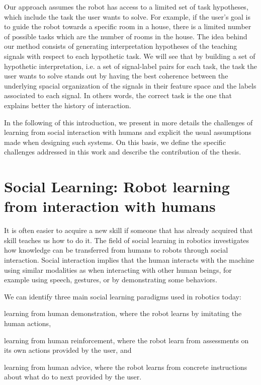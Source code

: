Our approach assumes the robot has access to a limited set of task hypotheses, which include the task the user wants to solve. For example, if the user's goal is to guide the robot towards a specific room in a house, there is a limited number of possible tasks which are the number of rooms in the house. The idea behind our method consists of generating interpretation hypotheses of the teaching signals with respect to each hypothetic task. We will see that by building a set of hypothetic interpretation, i.e. a set of signal-label pairs for each task, the task the user wants to solve stands out by having the best coherence between the underlying spacial organization of the signals in their feature space and the labels associated to each signal. In others words, the correct task is the one that explains better the history of interaction.

In the following of this introduction, we present in more details the challenges of learning from social interaction with humans and explicit the usual assumptions made when designing such systems. On this basis, we define the specific challenges addressed in this work and describe the contribution of the thesis.

\section{Social Learning: Robot learning from interaction with humans}
\label{sec:intro:social}

It is often easier to acquire a new skill if someone that has already acquired that skill teaches us how to do it. The field of social learning in robotics investigates how knowledge can be transferred from humans to robots through social interaction. Social interaction implies that the human interacts with the machine using similar modalities as when interacting with other human beings, for example using speech, gestures, or by demonstrating some behaviors.

We can identify three main social learning paradigms used in robotics today: \begin{inparaenum}[(a)] \item learning from human demonstration, where the robot learns by imitating the human actions, \item learning from human reinforcement, where the robot learn from assessments on its own actions provided by the user, and \item learning from human advice, where the robot learns from concrete instructions about what do to next provided by the user. \end{inparaenum}

